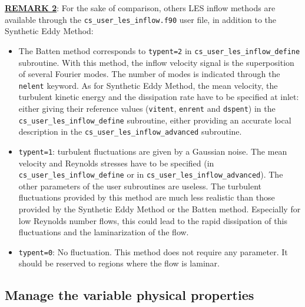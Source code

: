 {{{{\bf \underline{REMARK 2}}: For the sake of comparison, others LES inflow methods are
available through the
\texttt{cs\_user\_les\_inflow.f90} user file, in addition to the
Synthetic Eddy Method:

\begin{itemize}
\item The Batten method corresponds to \texttt{typent=2} in
  \texttt{cs\_user\_les\_inflow\_define} subroutine. With this method,
  the inflow velocity signal is the superposition of several Fourier
  modes. The number of modes is indicated through the
  \texttt{nelent} keyword. As   for Synthetic Eddy Method, the mean
  velocity, the turbulent kinetic energy and the dissipation rate have
  to be specified at inlet: either giving their reference values
  (\texttt{vitent}, \texttt{enrent} and \texttt{dspent}) in the
  \texttt{cs\_user\_les\_inflow\_define} subroutine, either providing
  an accurate local description in the
  \texttt{cs\_user\_les\_inflow\_advanced} subroutine.

\item \texttt{typent=1}: turbulent fluctuations are given by a Gaussian
  noise. The mean velocity and Reynolds stresses have to be specified
  (in \texttt{cs\_user\_les\_inflow\_define} or in
  \texttt{cs\_user\_les\_inflow\_advanced}). The other parameters of
  the user subroutines are useless. The turbulent fluctuations
  provided by this method are much less realistic than those provided
  by the Synthetic Eddy Method or the Batten method. Especially for
  low Reynolds number flows, this could lead to the rapid dissipation
  of this fluctuations and the laminarization of the flow.

\item \texttt{typent=0}: No fluctuation. This method does not require
  any parameter. It should be reserved to regions where the flow is
  laminar.
\end{itemize}

\subsection{Manage the variable physical properties}
}}}
